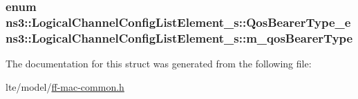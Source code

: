 \subsubsection[{\texorpdfstring{m\+\_\+qos\+Bearer\+Type}{m_qosBearerType}}]{\setlength{\rightskip}{0pt plus 5cm}enum {\bf ns3\+::\+Logical\+Channel\+Config\+List\+Element\+\_\+s\+::\+Qos\+Bearer\+Type\+\_\+e}  ns3\+::\+Logical\+Channel\+Config\+List\+Element\+\_\+s\+::m\+\_\+qos\+Bearer\+Type}\hypertarget{structns3_1_1LogicalChannelConfigListElement__s_a56e0a315cb2ecb0cd9864c5e2580cc1c}{}\label{structns3_1_1LogicalChannelConfigListElement__s_a56e0a315cb2ecb0cd9864c5e2580cc1c}


The documentation for this struct was generated from the following file\+:\begin{DoxyCompactItemize}
\item 
lte/model/\hyperlink{ff-mac-common_8h}{ff-\/mac-\/common.\+h}\end{DoxyCompactItemize}
